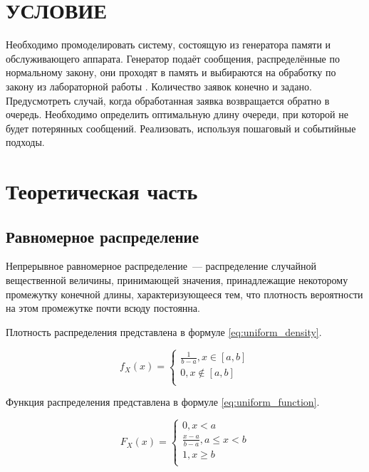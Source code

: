 \chapter*{\hfill{}УСЛОВИЕ\hfill{}}
Необходимо промоделировать систему, состоящую из генератора памяти и обслуживающего аппарата. Генератор подаёт сообщения, распределённые по нормальному закону, они проходят в память и выбираются на обработку по закону из лабораторной работы . Количество заявок конечно и задано. Предусмотреть случай, когда обработанная заявка возвращается обратно в очередь. Необходимо определить оптимальную длину очереди, при которой не будет потерянных сообщений. Реализовать, используя пошаговый и событийные подходы.

\chapter{Теоретическая часть}

\section{Равномерное распределение}

Непрерывное равномерное распределение~--- распределение случайной вещественной величины, принимающей значения, принадлежащие некоторому промежутку конечной длины, характеризующееся тем, что плотность вероятности на этом промежутке почти всюду постоянна.

Плотность распределения представлена в формуле \ref{eq:uniform_density}.

\begin{equation}\label{eq:uniform_density}
    f_X (x) =
    \begin{cases}
        \frac{1}{b-a}, x \in [a,b] \\
        0, x \notin [a, b] \\
    \end{cases}
\end{equation}

Функция распределения представлена в формуле \ref{eq:uniform_function}.

\begin{equation}\label{eq:uniform_function}
    F_X (x) =
    \begin{cases}
        0, x < a \\
        \frac{x - a}{b - a}, a \le x < b \\
        1, x \geq b \\
    \end{cases}
\end{equation}

